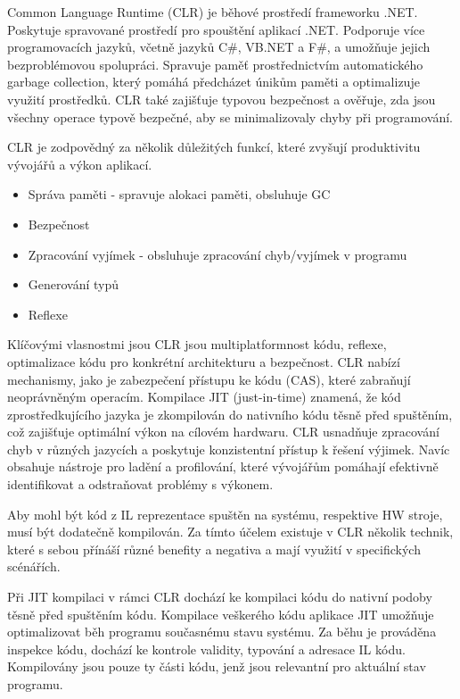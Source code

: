 
Common Language Runtime (CLR) je běhové prostředí frameworku .NET. Poskytuje spravované prostředí pro spouštění aplikací .NET. Podporuje více programovacích jazyků, včetně jazyků C\#, VB.NET a F\#, a umožňuje jejich bezproblémovou spolupráci. Spravuje paměť prostřednictvím automatického garbage collection, který pomáhá předcházet únikům paměti a optimalizuje využití prostředků. CLR také zajišťuje typovou bezpečnost a ověřuje, zda jsou všechny operace typově bezpečné, aby se minimalizovaly chyby při programování.


CLR je zodpovědný za několik důležitých funkcí, které zvyšují produktivitu vývojářů a výkon aplikací.

\begin{itemize}
    \item Správa paměti - spravuje alokaci paměti, obsluhuje GC
    \item Bezpečnost
    \item Zpracování vyjímek - obsluhuje zpracování chyb/vyjímek v programu
    \item Generování typů 
    \item Reflexe
\end{itemize}

Klíčovými vlasnostmi jsou CLR jsou multiplatformnost kódu, reflexe, optimalizace kódu pro konkrétní architekturu a bezpečnost. CLR nabízí mechanismy, jako je zabezpečení přístupu ke kódu (CAS), které zabraňují neoprávněným operacím. Kompilace JIT (just-in-time) znamená, že kód zprostředkujícího jazyka je zkompilován do nativního kódu těsně před spuštěním, což zajišťuje optimální výkon na cílovém hardwaru. CLR usnadňuje zpracování chyb v různých jazycích a poskytuje konzistentní přístup k řešení výjimek. Navíc obsahuje nástroje pro ladění a profilování, které vývojářům pomáhají efektivně identifikovat a odstraňovat problémy s výkonem.

Aby mohl být kód z IL reprezentace spuštěn na systému, respektive HW stroje, musí být dodatečně kompilován. Za tímto účelem existuje v CLR několik technik, které s sebou přínáší různé benefity a negativa a mají využití v specifických scénářích.


Při JIT kompilaci v rámci CLR dochází ke kompilaci kódu do nativní podoby těsně před spuštěním kódu. Kompilace veškerého kódu aplikace JIT umožňuje optimalizovat běh programu současnému stavu systému. Za běhu je prováděna inspekce kódu, dochází ke kontrole validity, typování a adresace IL kódu. Kompilovány jsou pouze ty části kódu, jenž jsou relevantní pro aktuální stav programu.

